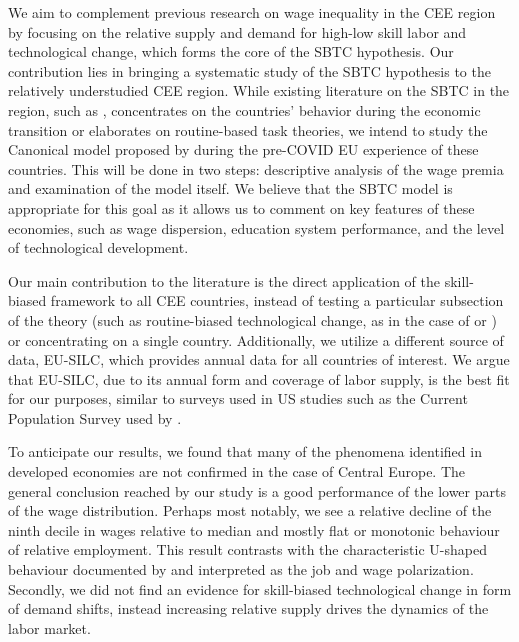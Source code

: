 \documentclass[11pt]{article}
\begin{document}
We aim to complement previous research on wage inequality in the CEE region by focusing on the relative supply and demand for high-low skill labor and technological change, which forms the core of the SBTC hypothesis. Our contribution lies in bringing a systematic study of the SBTC hypothesis to the relatively understudied CEE region. While existing literature on the SBTC in the region, such as \citet{tyrowicz2019wage}, concentrates on the countries' behavior during the economic transition or elaborates on routine-based task theories, we intend to study the Canonical model proposed by \citet{katz1992changes} during the pre-COVID EU experience of these countries. This will be done in two steps: descriptive analysis of the wage premia and examination of the model itself. We believe that the SBTC model is appropriate for this goal as it allows us to comment on key features of these economies, such as wage dispersion, education system performance, and the level of technological development.

Our main contribution to the literature is the direct application of the skill-biased framework to all CEE countries, instead of testing a particular subsection of the theory (such as routine-biased technological change, as in the case of \citet{arendt2019technical} or \citet{hardy2018educational}) or concentrating on a single country. Additionally, we utilize a different source of data, EU-SILC, which provides annual data for all countries of interest. We argue that EU-SILC, due to its annual form and coverage of labor supply, is the best fit for our purposes, similar to surveys used in US studies such as the Current Population Survey used by \citet{katz1992changes}.

To anticipate our results, we found that many of the phenomena identified in developed economies are not confirmed in the case of Central Europe. The general conclusion reached by our study is a good performance of the lower parts of the wage distribution. Perhaps most notably, we see a relative decline of the ninth decile in wages relative to median and mostly flat or monotonic behaviour of relative employment. This result contrasts with the characteristic U-shaped behaviour documented by \citet{acemoglu2012does} and interpreted as the job and wage polarization. Secondly, we did not find an evidence for skill-biased technological change in form of demand shifts, instead increasing relative supply drives the dynamics of the labor market. %
\end{document}
